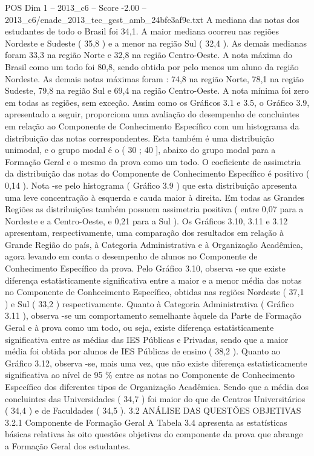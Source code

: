\begin{textsample}{POS Dim 1 – 2013\_c6 – Score -2.00 – 2013\_c6/enade\_2013\_tec\_gest\_amb\_24bfe3af9c.txt}
A mediana das notas dos estudantes de todo o Brasil foi 34,1.
A maior mediana ocorreu nas regiões Nordeste e Sudeste ( 35,8 ) e a menor na região Sul ( 32,4 ).
As demais medianas foram 33,3 na região Norte e 32,8 na região Centro-Oeste.
A nota máxima do Brasil como um todo foi 80,8, sendo obtida por pelo menos um aluno da região Nordeste.
As demais notas máximas foram : 74,8 na região Norte, 78,1 na região Sudeste, 79,8 na região Sul e 69,4 na região Centro-Oeste.
A nota mínima foi zero em todas as regiões, sem exceção.
Assim como os Gráficos 3.1 e 3.5, o Gráfico 3.9, apresentado a seguir, proporciona uma avaliação do desempenho de concluintes em relação ao Componente de Conhecimento Específico com um histograma da distribuição das notas correspondentes.
Esta também é uma distribuição unimodal, e o grupo modal é o ( 30 ; 40 ], abaixo do grupo modal para a Formação Geral e o mesmo da prova como um todo.
O coeficiente de assimetria da distribuição das notas do Componente de Conhecimento Específico é positivo ( 0,14 ).
Nota -se pelo histograma ( Gráfico 3.9 ) que esta distribuição apresenta uma leve concentração à esquerda e cauda maior à direita.
Em todas as Grandes Regiões as distribuições também possuem assimetria positiva ( entre 0,07 para a Nordeste e a Centro-Oeste, e 0,21 para a Sul ).
Os Gráficos 3.10, 3.11 e 3.12 apresentam, respectivamente, uma comparação dos resultados em relação à Grande Região do país, à Categoria Administrativa e à Organização Acadêmica, agora levando em conta o desempenho de alunos no Componente de Conhecimento Específico da prova.
Pelo Gráfico 3.10, observa -se que existe diferença estatisticamente significativa entre a maior e a menor média das notas no Componente de Conhecimento Específico, obtidas nas regiões Nordeste ( 37,1 ) e Sul ( 33,2 ) respectivamente.
Quanto à Categoria Administrativa ( Gráfico 3.11 ), observa -se um comportamento semelhante àquele da Parte de Formação Geral e à prova como um todo, ou seja, existe diferença estatisticamente significativa entre as médias das IES Públicas e Privadas, sendo que a maior média foi obtida por alunos de IES Públicas de ensino ( 38,2 ).
Quanto ao Gráfico 3.12, observa -se, mais uma vez, que não existe diferença estatisticamente significativa ao nível de 95 \% entre as notas no Componente de Conhecimento Específico dos diferentes tipos de Organização Acadêmica.
Sendo que a média dos concluintes das Universidades ( 34,7 ) foi maior do que de Centros Universitários ( 34,4 ) e de Faculdades ( 34,5 ). 3.2 ANÁLISE DAS QUESTÕES OBJETIVAS 3.2.1 Componente de Formação Geral A Tabela 3.4 apresenta as estatísticas básicas relativas às oito questões objetivas do componente da prova que abrange a Formação Geral dos estudantes.

\end{textsample}
